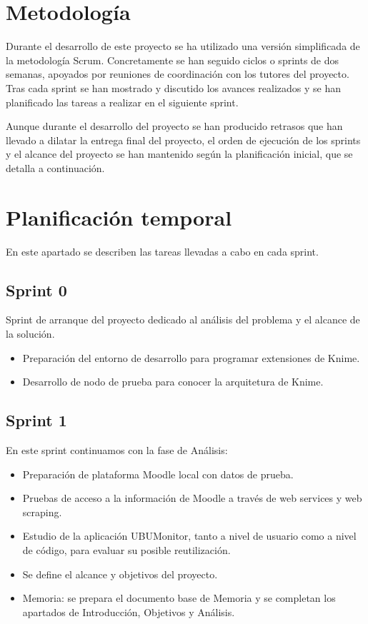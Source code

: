 
\section{Metodología}

Durante el desarrollo de este proyecto se ha utilizado una versión simplificada de la metodología Scrum. Concretamente se han
seguido ciclos o sprints de dos semanas, apoyados por reuniones de coordinación con los tutores del proyecto. Tras cada sprint se 
han mostrado y discutido los avances realizados y se han planificado las tareas a realizar en el siguiente sprint. 
\

Aunque durante el desarrollo del proyecto se han producido retrasos que han llevado a dilatar la 
entrega final del proyecto, el orden de ejecución de los sprints y el alcance del proyecto se han 
mantenido según la planificación inicial, que se detalla a continuación. 


\section{Planificación temporal}

En este apartado se describen las tareas llevadas a cabo en cada sprint. 

\subsection{Sprint 0}

Sprint de arranque del proyecto dedicado al análisis del problema y el alcance de la solución. 

\begin{itemize}
	\item Preparación del entorno de desarrollo para programar extensiones de Knime.
	\item Desarrollo de nodo de prueba para conocer la arquitetura de Knime.
\end{itemize}


\subsection{Sprint 1}

En este sprint continuamos con la fase de Análisis: 

\begin{itemize}
	\item Preparación de plataforma Moodle local con datos de prueba. 
	\item Pruebas de acceso a la información de Moodle a través de web services y web scraping. 
    \item Estudio de la aplicación UBUMonitor, tanto a nivel de usuario como a nivel de código, para evaluar su posible reutilización.
    \item Se define el alcance y objetivos del proyecto.
    \item Memoria: se prepara el documento base de Memoria y se completan los apartados de Introducción, Objetivos y Análisis. 
\end{itemize}


